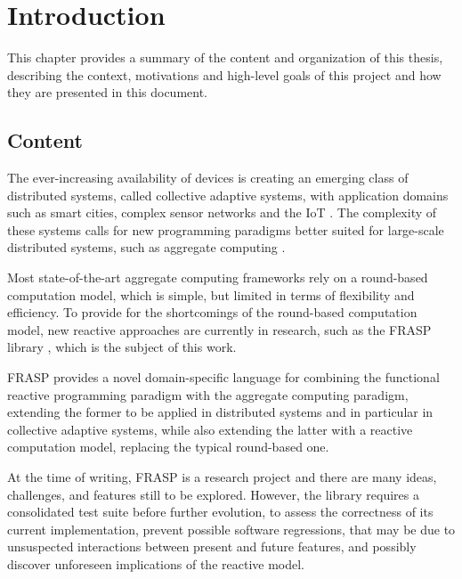
\chapter{Introduction}
\label{chapter:introduction}

This chapter provides a summary of the content and organization of this thesis,
describing the context, motivations and high-level goals of this project and
how they are presented in this document.

\section{Content}
\label{section:introduction:content}

The ever-increasing availability of devices is creating an emerging class of
distributed systems, called collective adaptive systems, with application
domains such as smart cities, complex sensor networks and the \ac{IoT}
\cite{CAS-AggregateComputingBlocks}. The complexity of these systems calls for
new programming paradigms better suited for large-scale distributed systems,
such as aggregate computing \cite{FieldCalculus-AggregateComputing}.

Most state-of-the-art aggregate computing frameworks rely on a round-based
computation model, which is simple, but limited in terms of flexibility and
efficiency. To provide for the shortcomings of the round-based computation
model, new reactive approaches are currently in research, such as the FRASP
library \cite{FRASP}, which is the subject of this work.

FRASP provides a novel domain-specific language for combining the functional
reactive programming paradigm with the aggregate computing paradigm, extending
the former to be applied in distributed systems and in particular in collective
adaptive systems, while also extending the latter with a reactive computation
model, replacing the typical round-based one.

At the time of writing, FRASP is a research project and there are many ideas,
challenges, and features still to be explored. However, the library requires a
consolidated test suite before further evolution, to assess the correctness of
its current implementation, prevent possible software regressions, that may be
due to unsuspected interactions between present and future features, and
possibly discover unforeseen implications of the reactive model.

